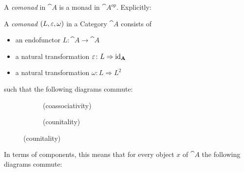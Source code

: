 A \textit{comonad} in $\cat{A}$ is a monad in $\cat{A}^{op}$. Explicitly:
\begin{definition}[comonad]
A \textit{comonad} $(L,\varepsilon, \omega) $ in a Category $\cat{A}$ consists of
\begin{itemize}
    \item an endofunctor $L\colon \cat{A} \to \cat{A}$
    \item a natural transformation $\varepsilon \colon L \Rightarrow \operatorname{id}_{\mathbf{A}}$ 
    \item a natural transformation $\omega\colon L \Rightarrow L^2 $
\end{itemize}  
such that the following diagrams commute:

\begin{figure}[H]
\centering
\begin{subfigure}{0.4\textwidth}
\centering
\caption*{(coassociativity)}
\end{subfigure}
\hspace{2em}
\begin{subfigure}{0.4\textwidth}
\centering
\caption*{(counitality)}
\end{subfigure}
\end{figure}


In terms of components, this means that for every object $x$ of $\cat{A}$
the following diagrams commute:


\end{definition}

